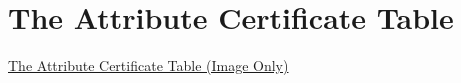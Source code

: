 \section{The Attribute Certificate Table}

\href{https://learn.microsoft.com/en-us/windows/win32/debug/pe-format#the-attribute-certificate-table-image-only}{The Attribute Certificate Table (Image Only)}